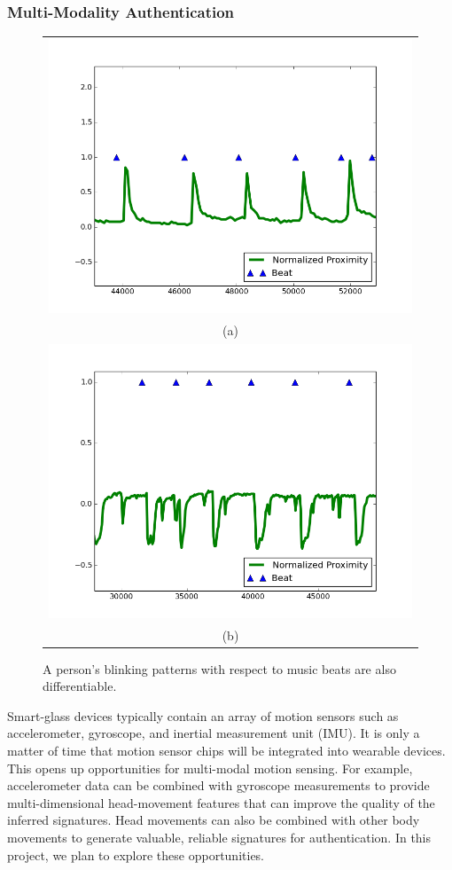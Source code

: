 \subsubsection{Multi-Modality Authentication}
\begin{figure}\centering
\begin{tabular}{c}
\includegraphics[width=0.75\linewidth]{../figure/sub1_blink_beat} \\
(a)\\
\vspace{-4pt}
\includegraphics[width=0.75\linewidth]{../figure/sub2_blink_beat} \\
(b)\\
\end{tabular}
    \caption{\label{fig:blink} A person's blinking patterns with respect to music beats are also differentiable.}
\vspace{-6pt}
\end{figure}
Smart-glass devices typically contain an array of motion sensors such as accelerometer, gyroscope, and inertial measurement unit (IMU). It is only a matter of time that motion sensor chips will be integrated into wearable devices.
This opens up opportunities for multi-modal motion sensing. For example,
accelerometer data can be combined with gyroscope measurements to provide
multi-dimensional head-movement features that can improve the quality of the
inferred signatures. Head movements can also be combined with other body movements to generate
valuable, reliable signatures for authentication. In this project, we plan to explore these opportunities.


